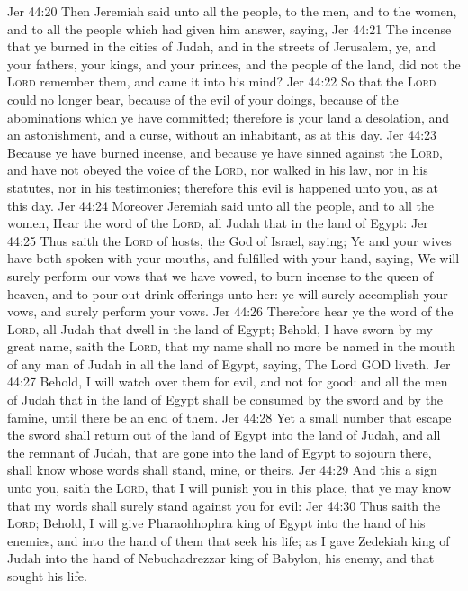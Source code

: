 \vs Jer 44:20 Then Jeremiah said unto all the people, to the men, and to the women, and to all the people which had given him  answer, saying,
\vs Jer 44:21 The incense that ye burned in the cities of Judah, and in the streets of Jerusalem, ye, and your fathers, your kings, and your princes, and the people of the land, did not the \textsc{Lord} remember them, and came it  into his mind?
\vs Jer 44:22 So that the \textsc{Lord} could no longer bear, because of the evil of your doings,  because of the abominations which ye have committed; therefore is your land a desolation, and an astonishment, and a curse, without an inhabitant, as at this day.
\vs Jer 44:23 Because ye have burned incense, and because ye have sinned against the \textsc{Lord}, and have not obeyed the voice of the \textsc{Lord}, nor walked in his law, nor in his statutes, nor in his testimonies; therefore this evil is happened unto you, as at this day.
\vs Jer 44:24 Moreover Jeremiah said unto all the people, and to all the women, Hear the word of the \textsc{Lord}, all Judah that  in the land of Egypt:
\vs Jer 44:25 Thus saith the \textsc{Lord} of hosts, the God of Israel, saying; Ye and your wives have both spoken with your mouths, and fulfilled with your hand, saying, We will surely perform our vows that we have vowed, to burn incense to the queen of heaven, and to pour out drink offerings unto her: ye will surely accomplish your vows, and surely perform your vows.
\vs Jer 44:26 Therefore hear ye the word of the \textsc{Lord}, all Judah that dwell in the land of Egypt; Behold, I have sworn by my great name, saith the \textsc{Lord}, that my name shall no more be named in the mouth of any man of Judah in all the land of Egypt, saying, The Lord GOD liveth.
\vs Jer 44:27 Behold, I will watch over them for evil, and not for good: and all the men of Judah that  in the land of Egypt shall be consumed by the sword and by the famine, until there be an end of them.
\vs Jer 44:28 Yet a small number that escape the sword shall return out of the land of Egypt into the land of Judah, and all the remnant of Judah, that are gone into the land of Egypt to sojourn there, shall know whose words shall stand, mine, or theirs.
\vs Jer 44:29 And this  a sign unto you, saith the \textsc{Lord}, that I will punish you in this place, that ye may know that my words shall surely stand against you for evil:
\vs Jer 44:30 Thus saith the \textsc{Lord}; Behold, I will give Pharaohhophra king of Egypt into the hand of his enemies, and into the hand of them that seek his life; as I gave Zedekiah king of Judah into the hand of Nebuchadrezzar king of Babylon, his enemy, and that sought his life.
